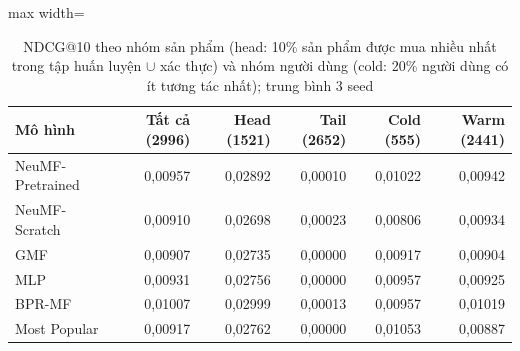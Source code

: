 \begin{table}[htbp]
    \centering\small
    \caption{NDCG@10 theo nhóm sản phẩm (head: 10\% sản phẩm được mua nhiều nhất trong tập huấn luyện $\cup$ xác thực) và nhóm người dùng (cold: 20\% người dùng có ít tương tác nhất); trung bình 3 seed}
    \label{tab:stratified}
    \begin{adjustbox}{max width=\textwidth}
    \begin{tabular}{lrrrrr}
        \toprule
        Mô hình & Tất cả (2996) & Head (1521) & Tail (2652) & Cold (555) & Warm (2441) \\
        \midrule
        NeuMF-Pretrained & 0{,}00957 & 0{,}02892 & 0{,}00010 & 0{,}01022 & 0{,}00942 \\
        NeuMF-Scratch & 0{,}00910 & 0{,}02698 & 0{,}00023 & 0{,}00806 & 0{,}00934 \\
        GMF & 0{,}00907 & 0{,}02735 & 0{,}00000 & 0{,}00917 & 0{,}00904 \\
        MLP & 0{,}00931 & 0{,}02756 & 0{,}00000 & 0{,}00957 & 0{,}00925 \\
        BPR-MF & 0{,}01007 & 0{,}02999 & 0{,}00013 & 0{,}00957 & 0{,}01019 \\
        Most Popular & 0{,}00917 & 0{,}02762 & 0{,}00000 & 0{,}01053 & 0{,}00887 \\
        \bottomrule
    \end{tabular}
    \end{adjustbox}
    \par{}
\end{table}

